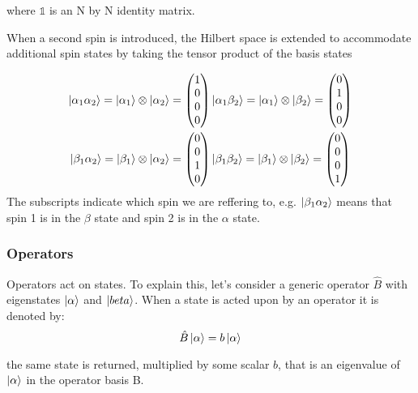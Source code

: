 where $\mathbb{1}$ is an N by N identity matrix.

When a second spin is introduced, the Hilbert space is extended to accommodate additional spin
states by taking the tensor product of the basis states


\begin{align}\label{eqn:2spinstates}
\ket{\alpha_{1}\alpha_{2}} = \ket{\alpha_1} \otimes \ket{\alpha_2} = \begin{pmatrix}
  1\\
  0\\
  0\\
  0
\end{pmatrix} &
\ket{\alpha_{1}\beta_{2}} = \ket{\alpha_1} \otimes \ket{\beta_2} = \begin{pmatrix}
  0\\
  1\\
  0\\
  0
\end{pmatrix}\\
\ket{\beta_{1}\alpha_{2}} = \ket{\beta_1} \otimes \ket{\alpha_2} = \begin{pmatrix}
  0\\
  0\\
  1\\
  0
\end{pmatrix} &
\ket{\beta_{1}\beta_{2}} = \ket{\beta_1} \otimes \ket{\beta_2} = \begin{pmatrix}
  0\\
  0\\
  0\\
  1
\end{pmatrix}
\end{align}
The subscripts indicate which spin we are reffering to, e.g. $\ket{\beta_1\alpha_2}$ means that
spin 1 is in the $\beta$ state and spin 2 is in the $\alpha$ state.

\subsubsection{Operators}

Operators act on states. To explain this, let's consider a generic operator $\hat{B}$ with eigenstates $\ket{\alpha}$ and $\ket{beta}$. When a state is acted upon by an operator it is denoted by:
\begin{equation}
  \hat{B}\ket{\alpha} = b\ket{\alpha}
\end{equation}

the same state is returned, multiplied by some scalar $b$, that is an eigenvalue of $\ket{\alpha}$
in the operator basis B.

